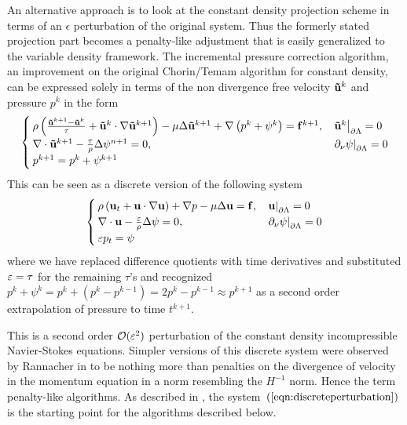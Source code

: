 \documentclass[letterpaper]{erdc}
\begin{document}
An alternative approach is to look at the constant density projection scheme in
terms of an $\epsilon$ perturbation of the original system. Thus the formerly
stated projection part becomes a penalty-like adjustment that is easily
generalized to the variable density framework.  The incremental pressure
correction algorithm, an improvement on the original Chorin/Temam algorithm for
constant density, can be expressed solely in terms of the non divergence free
velocity $\mathbf{\tilde{u}}^{k}$ and pressure $p^{k}$ in the form
\begin{equation}
  \begin{cases}
    \rho\left(\frac{\mathbf{\tilde{u}}^{k+1} - \mathbf{\tilde{u}}^{k}}{\tau} + \mathbf{\tilde{u}}^{k}\cdot\nabla\mathbf{\tilde{u}}^{k+1} \right) - \mu\Delta\mathbf{\tilde{u}}^{k+1} + \nabla\left(p^{k} + \psi^{k}  \right) = \mathbf{f}^{k+1}, & \left.\mathbf{\tilde{u}}^{k}\right|_{\partial\Lambda} = 0\\
    \nabla\cdot\mathbf{\tilde{u}}^{k+1} - \frac{\tau}{\rho}\Delta\psi^{n+1}=0, &\left.\partial_\nu\psi\right|_{\partial\Lambda} = 0\\
    p^{k+1} = p^{k} + \psi^{k+1}
  \end{cases}
\end{equation}
This can be seen as a discrete version of the following system
\begin{equation}\label{eqn:discreteperturbation}
  \begin{cases}
    \rho\left(\textbf{u}_t + \textbf{u}\cdot\nabla\textbf{u}  \right) + \nabla p -\mu\Delta\textbf{u} = \mathbf{f}, & \left.\textbf{u}\right|_{\partial\Lambda} = 0\\
    \nabla\cdot\textbf{u} - \frac{\varepsilon}{\rho}\Delta \psi = 0,& \left.\partial_\nu \psi\right|_{\partial\Lambda} = 0\\
    \varepsilon p_t = \psi
  \end{cases}
\end{equation}
where we have replaced difference quotients with time derivatives and
substituted $\varepsilon = \tau$ for the remaining $\tau$'s and recognized
$p^{k} + \psi^{k} = p^{k} + \left( p^{k} - p^{k-1} \right) = 2p^{k} - p^{k-1}
\approx p^{k+1}$ as a second order extrapolation of pressure to time $t^{k+1}$.

This is a second order $\mathcal{O}(\varepsilon^2)$ perturbation of the constant
density incompressible Navier-Stokes equations.  Simpler versions of this
discrete system were observed by Rannacher in \cite{rannacher1992chorin} to be
nothing more than penalties on the divergence of velocity in the momentum
equation in a norm resembling the $H^{-1}$ norm.  Hence the term penalty-like
algorithms.  As described in \cite{guermond2009splitting}, the
system~$\left(\ref{eqn:discreteperturbation}\right)$ is the starting point for
the algorithms described below.
\end{document}
